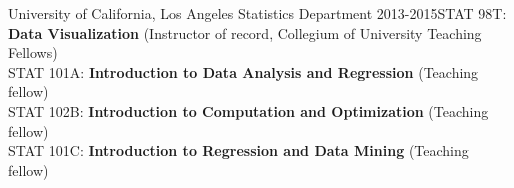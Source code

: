 %


\begin{reSubsection}{University of California, Los Angeles }{ Statistics Department }{2013-2015}{STAT 98T: \textbf{Data Visualization }(Instructor of record, Collegium of University Teaching Fellows) \\
STAT 101A: \textbf{Introduction to Data Analysis and Regression} (Teaching fellow) \\
STAT 102B: \textbf{Introduction to Computation and Optimization} (Teaching fellow) \\
STAT 101C: \textbf{Introduction to Regression and Data Mining} (Teaching fellow) \\
}
\end{reSubsection}


